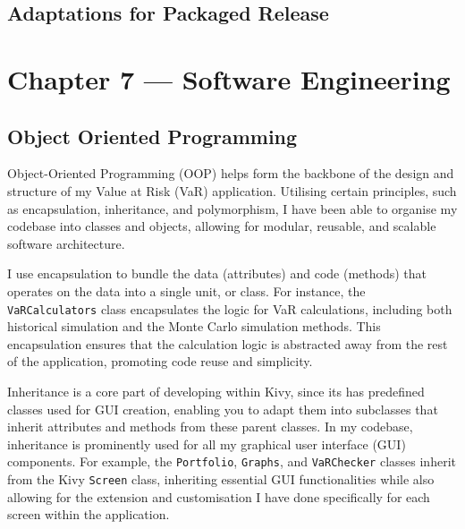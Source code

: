 \documentclass{article}
\begin{document}
\subsection{Adaptations for Packaged Release}






\section{Chapter 7 --- Software Engineering}

\subsection{Object Oriented Programming}

Object-Oriented Programming (OOP) helps form the backbone of the design and structure of my Value at Risk (VaR) application. Utilising certain principles, such as encapsulation, inheritance, and polymorphism, I have been able to organise my codebase into classes and objects, allowing for modular, reusable, and scalable software architecture.\\\vspace{0.3cm}

I use encapsulation to bundle the data (attributes) and code (methods) that operates on the data into a single unit, or class. For instance, the \texttt{VaRCalculators} class encapsulates the logic for VaR calculations, including both historical simulation and the Monte Carlo simulation methods. This encapsulation ensures that the calculation logic is abstracted away from the rest of the application, promoting code reuse and simplicity.\\\vspace{0.3cm}

Inheritance is a core part of developing within Kivy, since its has predefined classes used for GUI creation, enabling you to adapt them into subclasses that inherit attributes and methods from these parent classes. In my codebase, inheritance is prominently used for all my graphical user interface (GUI) components. For example, the \texttt{Portfolio}, \texttt{Graphs}, and \texttt{VaRChecker} classes inherit from the Kivy \texttt{Screen} class, inheriting essential GUI functionalities while also allowing for the extension and customisation I have done specifically for each screen within the application.\\\vspace{0.3cm}
\end{document}
